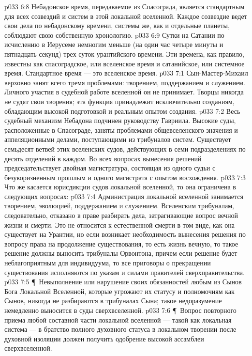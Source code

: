 \vs p033 6:8 Небадонское время, передаваемое из Спасограда, является стандартным для всех созвездий и систем в этой локальной вселенной. Каждое созвездие ведет свои дела по небадонскому времени, системы же, как и отдельные планеты, соблюдают свою собственную хронологию.
\vs p033 6:9 Сутки на Сатании по исчислению в Иерусеме немногим меньше (на один час четыре минуты и пятнадцать секунд) трех суток урантийского времени. Эти времена, как правило, известны как спасоградское, или вселенское время и сатанийское, или системное время. Стандартное время --- это вселенское время.
\vs p033 7:1 Сын\hyp{}Мастер\hyp{}Михаил верховно занят всего тремя проблемами: творением, поддержанием и служением. Личного участия в судебной работе вселенной он не принимает. Творцы никогда не судят свои творения; эта функция принадлежит исключительно созданиям, обладающим высокой подготовкой и реальным опытом создания.
\vs p033 7:2 Весь судебный механизм Небадона подчинен руководству Гавриила. Высокие суды, расположенные в Спасограде, заняты проблемами общевселенского значения и аппеляционными делами, поступающими из трибуналов систем. Существует семьдесят ветвей этих вселенских судов, действующих в семи подразделениях по десять отделений в каждом. Во всех вопросах вынесения решений председательствует двойная магистратура, состоящая из одного судьи с безукоризненным прошлым и одного магистрата с опытом восхождения.
\vs p033 7:3 Что же касается юрисдикции судов локальной вселенной, то она ограничена в следующих вопросах:
\vs p033 7:4 \bibnobreakspace Администрация локальной вселенной занимается творением, эволюцией, поддержанием и служением. Вселенским трибуналам, следовательно, отказано в праве разбирать дела, затрагивающие вопрос вечной жизни и смерти. Это не относится к естественной смерти в том виде, как она существует на Урантии, но если возникает необходимость вынесения решения по вопросу права на продолжение существования, то есть жизнь вечную, то такое решение должны выносить трибуналы Орвонтона, причем если решение будет неблагоприятным для индивидуума, то все приговоры о прекращении существования исполняются по указам и силами правителей сверхправительства.
\vs p033 7:5 \P\ \bibnobreakspace Невыполнение или нарушение своих обязанностей любым из Сынов Бога Локальной Вселенной, которые угрожают их статусу и полномочиям как Сынов, никогда не разбираются в трибуналах Сына; такое недоразумение немедленно выносится в суды сверхвселенной.
\vs p033 7:6 \P\ \bibnobreakspace Вопрос повторного приема любой составной части локальной вселенной --- такой как локальная система --- в братство полного духовного статуса в локальном творении после духовной изоляции должен получить одобрение высокой ассамблеи сверхвселенной.

